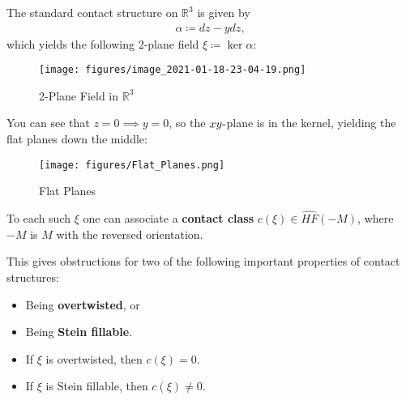 \begin{example}[?]

The standard contact structure on \({\mathbb{R}}^3\) is given by
\begin{align*}
\alpha\coloneqq dz - ydz
,\end{align*}
which yields the following 2-plane field \(\xi \coloneqq\ker \alpha\):

\begin{figure}
\centering
\texttt{[image: figures/image\_2021-01-18-23-04-19.png]}
\caption{2-Plane Field in \({\mathbb{R}}^3\)}
\end{figure}

You can see that \(z=0 \implies y=0\), so the \(xy{\hbox{-}}\)plane is
in the kernel, yielding the flat planes down the middle:

\begin{figure}
\centering
\texttt{[image: figures/Flat\_Planes.png]}
\caption{Flat Planes}
\end{figure}

\end{example}

\begin{proposition}

To each such \(\xi\) one can associate a \textbf{contact class}
\(c(\xi) \in \widehat{HF}(-M)\), where \(-M\) is \(M\) with the reversed
orientation.

\end{proposition}

\begin{remark}

This gives obstructions for two of the following important properties of
contact structures:

\begin{itemize}
\tightlist
\item
  Being \textbf{overtwisted}, or
\item
  Being \textbf{Stein fillable}.
\end{itemize}

\end{remark}

\begin{theorem}[?]

\envlist

\begin{itemize}
\tightlist
\item
  If \(\xi\) is overtwisted, then \(c(\xi) = 0\).
\item
  If \(\xi\) is Stein fillable, then \(c(\xi) \neq 0\).
\end{itemize}

\end{theorem}

